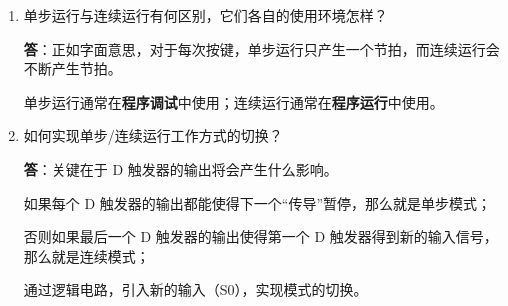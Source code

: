 \begin{enumerate}
    \item 单步运行与连续运行有何区别，它们各自的使用环境怎样？
    
    \textbf{答}：正如字面意思，对于每次按键，单步运行只产生一个节拍，而连续运行会不断产生节拍。
    
    单步运行通常在\textbf{程序调试}中使用；连续运行通常在\textbf{程序运行}中使用。
    
    \item 如何实现单步/连续运行工作方式的切换？
    
    \textbf{答}：关键在于 D 触发器的输出将会产生什么影响。
    
    如果每个 D 触发器的输出都能使得下一个“传导”暂停，那么就是单步模式；
    
    否则如果最后一个 D 触发器的输出使得第一个 D 触发器得到新的输入信号，那么就是连续模式；
    
    通过逻辑电路，引入新的输入（S0），实现模式的切换。
    
\end{enumerate}
